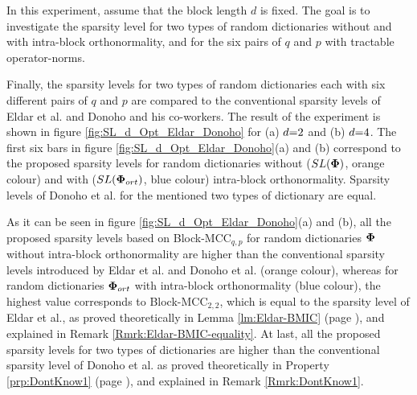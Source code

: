 In this experiment, assume that the block length $d$ is fixed.
The goal is to investigate the sparsity level for two types of random dictionaries without and with intra-block orthonormality, and for the six pairs of $q$ and $p$ with tractable operator-norms.

Finally, the sparsity levels for two types of random dictionaries each with six different pairs of $q$ and $p$ are compared to the conventional sparsity levels of Eldar et al. and Donoho and his co-workers.
The result of the experiment is shown in figure \ref{fig:SL_d_Opt_Eldar_Donoho} for (a) $d {=} 2$ and (b) $d {=} 4$.
The first six bars in figure \ref{fig:SL_d_Opt_Eldar_Donoho}(a) and (b) correspond to the proposed sparsity levels for random dictionaries without ($SL(\boldsymbol{\Phi})$, orange colour) and with ($SL(\boldsymbol{\Phi}_{ort})$, blue colour) intra-block orthonormality.
Sparsity levels of Donoho et al. for the mentioned two types of dictionary are equal. 

As it can be seen in figure \ref{fig:SL_d_Opt_Eldar_Donoho}(a) and (b), all the proposed sparsity levels based on Block-MCC$_{q,p}$ for random dictionaries $\boldsymbol{\Phi}$ without intra-block orthonormality are higher than the conventional sparsity levels introduced by Eldar et al. and Donoho et al. (orange colour), whereas for random dictionaries $\boldsymbol{\Phi}_{ort}$ with intra-block orthonormality (blue colour), the highest value corresponds to Block-MCC$_{2,2}$, which is equal to the sparsity level of Eldar et al., as proved theoretically in Lemma \ref{lm:Eldar-BMIC} (page \pageref{lm:Eldar-BMIC}), and explained in Remark \ref{Rmrk:Eldar-BMIC-equality}.
At last, all the proposed sparsity levels for two types of dictionaries are higher than the conventional sparsity level of Donoho et al. as proved theoretically in Property \ref{prp:DontKnow1} (page \pageref{prp:DontKnow1}), and explained in Remark \ref{Rmrk:DontKnow1}.

\FloatBarrier
